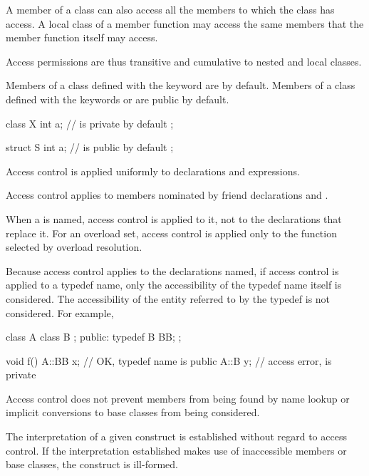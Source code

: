 \pnum
A member of a class can also access all the members to which the class has access.
A local class of a member function may access
the same members that the member function itself may access.
\begin{footnote}
Access
permissions are thus transitive and cumulative to nested
and local classes.
\end{footnote}

\pnum
{}%
%
%
Members of a class defined with the keyword
are
by default.
Members of a class defined with the keywords
 or 
are public by default.
\begin{example}
\begin{codeblock}
class X {
  int a;            //  is private by default
};

struct S {
  int a;            //  is public by default
};
\end{codeblock}
\end{example}

\pnum
Access control is applied uniformly to declarations and expressions.
\begin{note}
Access control applies to members nominated by
friend declarations and
.
\end{note}
When a  is named,
access control is applied to it, not to the declarations that replace it.
For an overload set, access control is applied only to
the function selected by overload resolution.
\begin{note}
Because access control applies to the declarations named, if access control is applied to a
typedef name, only the accessibility of the typedef name itself is considered.
The accessibility of the entity referred to by the typedef is not considered.
For example,

\begin{codeblock}
class A {
  class B { };
public:
  typedef B BB;
};

void f() {
  A::BB x;          // OK, typedef name  is public
  A::B y;           // access error,  is private
}
\end{codeblock}
\end{note}

\pnum
\begin{note}
Access control does not prevent members from being found by name lookup or
implicit conversions to base classes from being considered.
\end{note}
The interpretation of a given construct is
established without regard to access control.
If the interpretation
established makes use of inaccessible members or base classes,
the construct is ill-formed.

